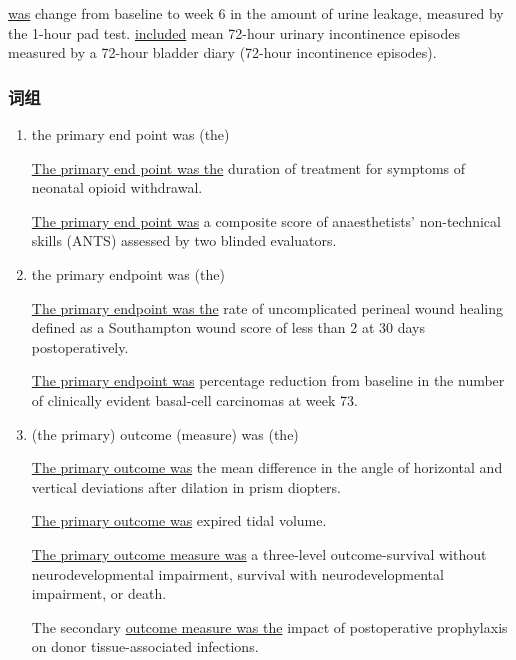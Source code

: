 \documentclass[a4paper]{ctexbook}
\begin{document}
    \begin{eg}[label={eg:2s5-2}]{}
       \uline{was} change from baseline to week 6 in the amount of urine leakage, measured by the 1-hour pad test.  \uline{included} mean 72-hour urinary incontinence episodes measured by a 72-hour bladder diary (72-hour incontinence episodes).
    \end{eg}

    \subsubsection{词组}

    \begin{enumerate}
      \item the primary end point was (the)
      \begin{eg}{}
        \uline{The primary end point was the} duration of treatment for symptoms of neonatal opioid withdrawal.        
      \end{eg}

      \begin{eg}{}
        \uline{The primary end point was} a composite score of anaesthetists' non-technical skills (ANTS) assessed by two blinded evaluators.   
      \end{eg}
      
      \item the primary endpoint was (the)
      \begin{eg}{}
        \uline{The primary endpoint was the} rate of uncomplicated perineal wound healing defined as a Southampton wound score of less than 2 at 30 days postoperatively.   
      \end{eg}

      \begin{eg}{}
        \uline{The primary endpoint was} percentage reduction from baseline in the number of clinically evident basal-cell carcinomas at week 73.   
      \end{eg}

      \item (the primary) outcome (measure) was (the)
      \begin{eg}{}
        \uline{The primary outcome was} the mean difference in the angle of horizontal and vertical deviations after dilation in prism diopters.   
      \end{eg}
      \begin{eg}{}
        \uline{The primary outcome was} expired tidal volume.   
      \end{eg}
      \begin{eg}{}
        \uline{The primary outcome measure was} a three-level outcome-survival without neurodevelopmental impairment, survival with neurodevelopmental impairment, or death. 
      \end{eg}
      \begin{eg}{}
        The secondary \uline{outcome measure was the} impact of postoperative prophylaxis on donor tissue-associated infections.   
      \end{eg}


\end{enumerate}
\end{document}
